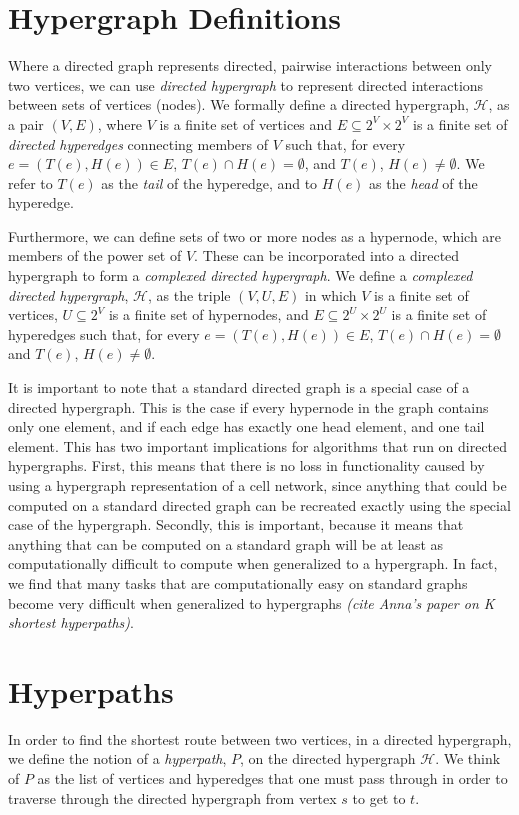 \documentclass[12pt,twoside]{reedthesis}
\begin{document}
\section{Hypergraph Definitions}
Where a directed graph represents directed, pairwise interactions between only two vertices, we can use \textit{directed hypergraph} to represent directed interactions between sets of vertices (nodes). We formally define a directed hypergraph, $\mathcal{H}$, as a pair $(V,E)$, where $V$ is a finite set of vertices and $E \subseteq 2^V \times 2^V$ is a finite set of \textit{directed hyperedges} connecting members of $V$ such that, for every $e=(T(e),H(e)) \in E$, $T(e) \cap H(e) = \emptyset$, and $T(e)$, $H(e) \neq \emptyset$.  We refer to $T(e)$ as the \textit{tail} of the hyperedge, and to $H(e)$ as the \textit{head} of the hyperedge.

Furthermore, we can define sets of two or more nodes as a hypernode, which are members of the power set of $V$.  These can be incorporated into a directed hypergraph to form a \textit{complexed directed hypergraph}.  We define a \textit{complexed directed hypergraph}, $\mathcal{H}$, as the triple $(V,U,E)$ in which $V$ is a finite set of vertices, $U \subseteq 2^V$ is a finite set of hypernodes, and $E \subseteq 2^U \times 2^U$ is a finite set of hyperedges such that, for every $e=(T(e),H(e)) \in E$, $T(e) \cap H(e) = \emptyset$ and $T(e)$, $H(e) \neq \emptyset$.

It is important to note that a standard directed graph is a special case of a directed hypergraph.  This is the case if every hypernode in the graph contains only one element, and if each edge has exactly one head element, and one tail element.  This has two important implications for algorithms that run on directed hypergraphs.  First, this means that there is no loss in functionality caused by using a hypergraph representation of a cell network, since anything that could be computed on a standard directed graph can be recreated exactly using the special case of the hypergraph. Secondly, this is important, because it means that anything that can be computed on a standard graph will be at least as computationally difficult to compute when generalized to a hypergraph.  In fact, we find that many tasks that are computationally easy on standard graphs become very difficult when generalized to hypergraphs \textit{(cite Anna's paper on K shortest hyperpaths)}.

\section{Hyperpaths}
In order to find the shortest route between two vertices, in a directed hypergraph, we define the notion of a \textit{hyperpath}, $P$, on the directed hypergraph $\mathcal{H}$.  We think of $P$ as the list of vertices and hyperedges that one must pass through in order to traverse through the directed hypergraph from vertex $s$ to get to $t$.
\end{document}
